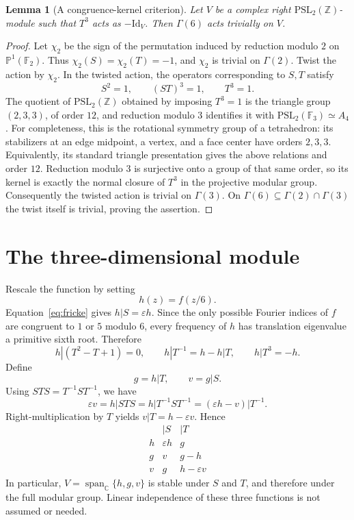 \documentclass[11pt]{article}
\newtheorem{lemma}[theorem]{Lemma}
\theoremstyle{remark}
\newcommand{\PSL}{\mathrm{PSL}}
\newcommand{\eps}{\varepsilon}
\begin{document}
\begin{lemma}[A congruence-kernel criterion]\label{lem:kernel}
Let $V$ be a complex right $\PSL_2(\mathbb Z)$-module such that $T^3$
acts as $-\mathrm{Id}_V$.  Then $\Gamma(6)$ acts trivially on $V$.
\end{lemma}
\begin{proof}
Let $\chi_2$ be the sign of the permutation induced by reduction modulo
$2$ on $\mathbb P^1(\mathbb F_2)$.  Thus
$\chi_2(S)=\chi_2(T)=-1$, and $\chi_2$ is trivial on $\Gamma(2)$.
Twist the action by $\chi_2$.  In the twisted action, the operators
corresponding to $S,T$ satisfy
\[
 S^2=1,\qquad (ST)^3=1,\qquad T^3=1.
\]
The quotient of $\PSL_2(\mathbb Z)$ obtained by imposing $T^3=1$ is the
triangle group $(2,3,3)$, of order $12$, and reduction modulo $3$
identifies it with $\PSL_2(\mathbb F_3)\simeq A_4$.  For completeness,
this is the rotational symmetry group of a tetrahedron: its stabilizers
at an edge midpoint, a vertex, and a face center have orders $2,3,3$.
Equivalently, its standard triangle presentation gives the above
relations and order $12$.  Reduction modulo $3$ is surjective onto a
group of that same order, so its kernel is exactly the normal closure
of $T^3$ in the projective modular group.
Consequently the twisted action is trivial on $\Gamma(3)$.
On $\Gamma(6)\subseteq\Gamma(2)\cap\Gamma(3)$ the twist itself is trivial,
proving the assertion.
\end{proof}

\section{The three-dimensional module}

Rescale the function by setting
\[
 h(z)=f(z/6).
\]
Equation~\eqref{eq:fricke} gives $h|S=\eps h$.  Since the only possible
Fourier indices of $f$ are congruent to $1$ or $5$ modulo $6$, every
frequency of $h$ has translation eigenvalue a primitive sixth root.
Therefore
\begin{equation}\label{eq:phi6}
 h|(T^2-T+1)=0,
 \qquad h|T^{-1}=h-h|T,
 \qquad h|T^3=-h.
\end{equation}
Define
\[
 g=h|T,\qquad v=g|S.
\]
Using $STS=T^{-1}ST^{-1}$, we have
\[
 \eps v=h|STS
     =h|T^{-1}ST^{-1}
     =(\eps h-v)|T^{-1}.
\]
Right-multiplication by $T$ yields $v|T=h-\eps v$.  Hence
\begin{equation}\label{eq:table}
\begin{array}{c|cc}
 & |S & |T\\ \hline
 h & \eps h & g\\
 g & v & g-h\\
 v & g & h-\eps v
\end{array}
\end{equation}
In particular, $V=\operatorname{span}_{\mathbb C}\{h,g,v\}$ is stable
under $S$ and $T$, and therefore under the full modular group.
Linear independence of these three functions is not assumed or needed.
\end{document}
